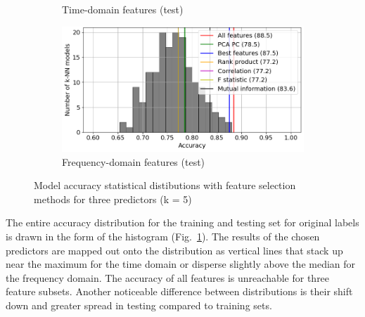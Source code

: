 \begin{figure}[h]
\begin{subfigure}[b]{0.48\textwidth}
        \caption{Time-domain features (test)}
    \end{subfigure}
    \hfill
    \begin{subfigure}[b]{0.48\textwidth}
        \includegraphics[width=\textwidth]{assets/results/feature-combinations/model-distr-fsel-k5-f3-FD-test.png}
        \caption{Frequency-domain features (test)}
    \end{subfigure}
    \caption{Model accuracy statistical distibutions with feature selection methods for three predictors (k = 5)}
    \label{fig:evaluation:fsel-model-distr}
\end{figure}

The entire accuracy distribution for the training and testing set for original labels is drawn in the form of the histogram (Fig.~\ref{fig:evaluation:fsel-model-distr}). The results of the chosen predictors are mapped out onto the distribution as vertical lines that stack up near the maximum for the time domain or disperse slightly above the median for the frequency domain. The accuracy of all features is unreachable for three feature subsets. Another noticeable difference between distributions is their shift down and greater spread in testing compared to training sets.

